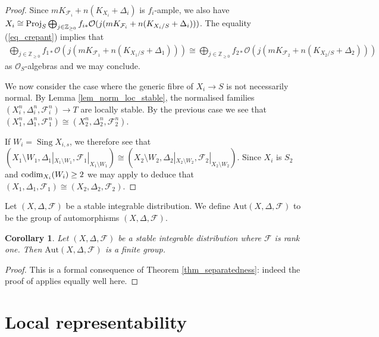 \documentclass[12pt, a4paper]{amsart}
\newcommand\Aut{\text{Aut}}
\DeclareMathOperator{\sing}{Sing}
\newcounter{Theorem}
\newtheorem{corollary}[theorem]{Corollary}
\theoremstyle{definition}
\theoremstyle{named}
\begin{document}
\begin{proof}
Since $mK_{\mathcal F_i}+n(K_{X_i}+\Delta_i)$ is $f_i$-ample, 
we also have
$X_i \cong {\rm Proj}_S\bigoplus_{j \in \mathbb Z_{\ge 0}} f_{i*}\mathcal O(j(mK_{\mathcal F_i}+n(K_{X_i/S}+\Delta_i)))$.
The equality (\ref{eq_crepant}) implies that 
\begin{align*}\bigoplus_{j \in \mathbb Z_{\ge 0}} f_{1*}\mathcal O(j(mK_{\mathcal F_1}+n(K_{X_1/S}+\Delta_1))) \cong \bigoplus_{j \in \mathbb Z_{\ge 0}} f_{2*}\mathcal O(j(mK_{\mathcal F_2}+n(K_{X_2/S}+\Delta_2)))\end{align*} as $\mathcal O_S$-algebras and we may conclude.    

\medskip

We now consider the case where the generic fibre 
of $X_i \rightarrow S$ is not necessarily normal.
By Lemma \ref{lem_norm_loc_stable}, the normalised families
$(X_i^n, \Delta^n_i, \mathcal F^n_i) \rightarrow T$
are locally stable.  By the previous case we see 
that $(X_1^n, \Delta^n_1, \mathcal F^n_1) \cong (X_2^n, \Delta^n_2, \mathcal F^n_2)$.

If $W_i = \sing X_{i, s}$, we therefore see that 
$(X_1\setminus W_1, \Delta_1|_{X_1\setminus W_1}, \mathcal F_1|_{X_1\setminus W_1}) \cong (X_2 \setminus W_2, \Delta_2|_{X_2 \setminus W_2}, \mathcal F_2|_{X_2 \setminus W_2})$.
Since $X_i$ is $S_2$ and ${\rm codim}_{X_i}(W_i) \ge 2$
we may apply \cite[Theorem 11.39]{modbook} to deduce that 
$(X_1, \Delta_1, \mathcal F_1) \cong (X_2, \Delta_2, \mathcal F_2)$.
\end{proof}




Let $(X, \Delta, \mathcal F)$ be 
a stable integrable distribution.
We define $\Aut (X, \Delta, \mathcal F)$ to be the group of automorphisms $(X, \Delta, \mathcal F)$.

\begin{corollary} \label{cor_finite_automorphisms}
    Let $(X, \Delta, \mathcal F)$
    be a stable integrable distribution where $\mathcal F$
is rank one.  Then $\Aut (X, \Delta, \mathcal F)$ is a finite group.
\end{corollary}
\begin{proof}
    This is a formal consequence of Theorem \ref{thm_separatedness}: indeed the proof of \cite[Proposition 8.64]{modbook} applies equally well here.
\end{proof}


\section{Local representability}
\end{document}
